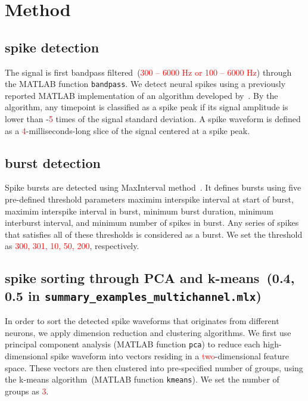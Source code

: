 \documentclass[11pt]{article}
\begin{document}
\section{Method}
\subsection{ spike detection}
The signal is first bandpass filtered~(\textcolor{red}{300 -- 6000 Hz or 100 -- 6000 Hz}) through the MATLAB function \texttt{bandpass}.
We detect neural spikes using a previously reported MATLAB implementation of an algorithm developed by~\citet{le_floch_stretchable_2022}.
By the algorithm, any timepoint is classified as a spike peak
if its signal amplitude is lower than -\textcolor{red}{5} times of the signal standard deviation.
A spike waveform is defined as a \textcolor{red}{4}-milliseconds-long slice of the signal centered at a spike peak.

\subsection{burst detection}
Spike bursts are detected using MaxInterval method~\citet{fair_electrophysiological_2020}. 
It defines bursts using five pre-defined threshold parameters\textemdash
maximim interspike interval at start of burst,
maximim interspike interval in burst,
minimum burst duration,
minimum interburst interval,
and
minimum number of spikes in burst.
Any series of spikes that satisfies all of these thresholds is considered as a burst.
We set the threshold as \textcolor{red}{300, 301, 10, 50, 200}, respectively.

\subsection{spike sorting through PCA and k-means~(0.4, 0.5 in \texttt{summary\_examples\_multichannel.mlx})}
In order to sort the detected spike waveforms that originates from different neurons, we apply dimension reduction and clustering algorithms.
We first use principal component analysis (MATLAB function \texttt{pca}) to reduce each high-dimensional spike waveform into vectors residing in a \textcolor{red}{two}-dimensional feature space.
These vectors are then clustered into pre-specified number of groups, using the k-means algorithm~(MATLAB function \texttt{kmeans}).
We set the number of groups as \textcolor{red}{3}.
\end{document}

